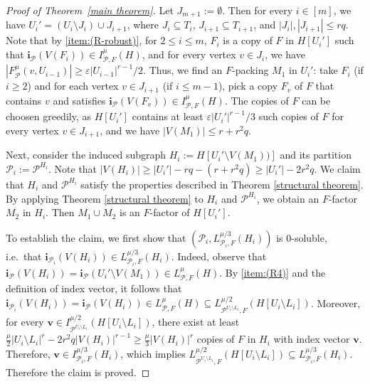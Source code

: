\documentclass[11pt, letterpaper]{amsart}
\theoremstyle{plain}
\numberwithin{equation}{section}
\theoremstyle{definition}
\newcommand\card[1]{\left| #1 \right|}
\renewcommand{\vec}[1]{{\mathbf #1}}
\begin{document}
\begin{proof}[Proof of Theorem~\ref{main theorem}]
        Let \(J_{m+1}:=\emptyset\). Then for every \(i\in [m]\), we have $U_i'=(U_i\setminus J_i)\cup J_{i+1}$, where $J_i\subseteq T_i$, $J_{i+1} \subseteq T_{i+1}$, and $|J_i|,|J_{i+1}|\leq rq$. 
        Note that by \ref{item:(R-robust)}, for \(2\le i\le m\), $F_i$ is a copy of $F$ in $H[U_i']$ such that $\vec{i}_{\mathcal{P}}(V(F_i)) \in I_{\mathcal{P}, F}^{\mu}(H)$, and for every vertex $v \in J_{i}$, we have $\left| F^{\mu}_{\mathcal{P}}(v, U_{i-1}) \right| \geq \varepsilon{|U_{i-1}|}^{r-1}/2$.
        Thus, we find an $F$-packing $M_1$ in $U_i'$: take $F_i$ (if \(i\ge 2\)) and for each vertex $v\in J_{i+1}$ (if \(i\le m-1\)), pick a copy $F_v$ of $F$ that contains $v$ and satisfies $\vec{i}_{\mathcal{P}}(V(F_v)) \in I_{\mathcal{P}, F}^{\mu}(H)$. 
        The copies of $F$ can be choosen greedily, as $H[U_i']$ contains at least $\varepsilon{|U_i'|}^{r-1}/3$ such copies of $F$ for every vertex $v \in J_{i+1}$, and we have $|V(M_1)| \leq r + r^2q$.

  
        Next, consider the induced subgraph $H_i:=H[U_{i}'\setminus V(M_1))]$ and its partition $ \mathcal{P}_i:=\mathcal{P}^{H_i}$. 
        Note that $|V(H_i)|\ge |U_i'|-rq-(r+r^2q)\ge |U_i'|-2r^2q$.
        We claim that $H_i$ and $ \mathcal{P}^{H_i}$ satisfy the properties described in Theorem \ref{structural theorem}. By applying Theorem \ref{structural theorem} to $ H_i$ and $ \mathcal{P}^{H_i}$, we obtain an $F$-factor $ M_2 $ in $H_i$. 
        Then $M_1\cup M_2$ is an $F$-factor of $H[U_i']$.

        To establish the claim, we first show that $(\mathcal{P}_i,L^{\mu/3}_{\mathcal{P}_i,F}(H_i))$ is $0$-soluble, i.e.~that $\vec{i}_{ \mathcal{P}_i}(V(H_i))\in L_{ \mathcal{P}_i,F}^{\mu/3}(H_i) $. 
        Indeed, observe that $ \vec{i}_{\mathcal{P}}(V(H_i))=\vec{i}_{\mathcal{P}}(U_{i}'\setminus V(M_1))\in L_{\mathcal{P},F}^{\mu}(H) $. 
        By \ref{item:(R4)} and the definition of index vector, it follows that $\vec{i}_{ \mathcal{P}_i}(V(H_i))=\vec{i}_{\mathcal{P}}(V(H_i))\in L_{\mathcal{P},F}^{\mu}(H)\subseteq L_{ \mathcal{P}^{U_{i}\setminus L_i},F}^{\mu/2}(H[U_{i}\setminus L_i])$. 
        Moreover, for every $\vec{v}\in I_{ \mathcal{P}^{U_{i}\setminus L_i}}^{\mu/2}(H[U_{i}\setminus L_i])$, there exist at least $\frac{\mu}{2}{|U_{i}\setminus L_i|}^r-2r^2q{\card{V(H_i)}}^{r-1}\ge \frac{\mu}{3}{|V(H_i)|}^{r}$ copies of $F$ in $H_i$ with index vector $\vec{v}$. Therefore, $\vec{v}\in I_{ \mathcal{P}_i,F}^{\mu/3}(H_i) $, which implies $L_{ \mathcal{P}^{U_{i}\setminus L_i},F}^{\mu/2}(H[U_{i}\setminus L_i])\subseteq L_{ \mathcal{P}_i,F}^{\mu/3}(H_i)$.
        Therefore the claim is proved.
  

\end{proof}
\end{document}
